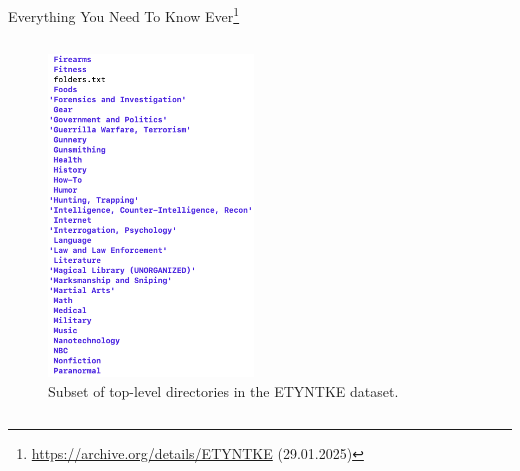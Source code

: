 \begin{frame}{Everything You Need To Know Ever\footnote{\url{https://archive.org/details/ETYNTKE} (29.01.2025)}}
\begin{columns}[T]
        \begin{column}{0.25\textwidth}
            \begin{figure}
                \includegraphics[width=\linewidth]{images/screenshot_data.png}
                \caption{Subset of top-level directories in the ETYNTKE dataset.} %
            \end{figure}
   
        \end{column}
    \end{columns}
\end{frame}
